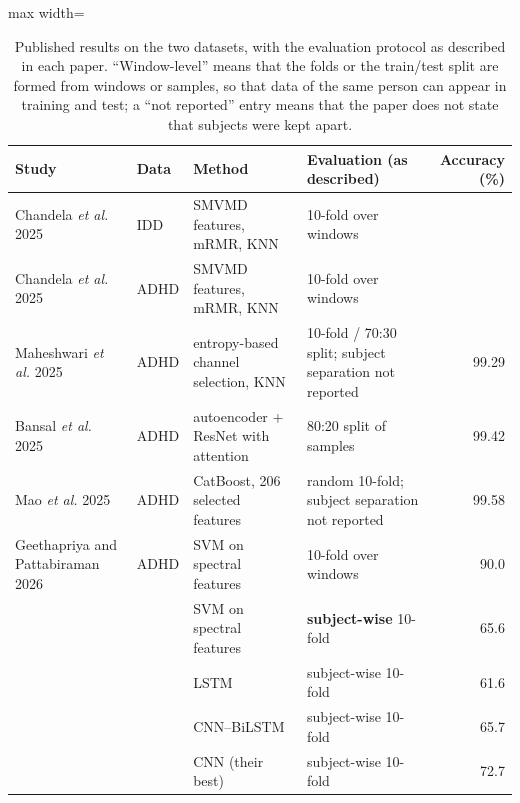 \begin{table}[H]
\caption{Published results on the two datasets, with the evaluation protocol as described in
each paper. ``Window-level'' means that the folds or the train/test split are formed from
windows or samples, so that data of the same person can appear in training and test; a
``not reported'' entry means that the paper does not state that subjects were kept apart.}
\label{tab:lit}\centering\small
\begin{adjustbox}{max width=\textwidth}
\begin{tabular}{p{3.3cm}p{1.2cm}p{4.4cm}p{3.9cm}r}
\hline
Study & Data & Method & Evaluation (as described) & Accuracy (\%) \\
\hline
Chandela \emph{et al.} 2025~\cite{chandela2025} & IDD & SMVMD features, mRMR, KNN & 10-fold over windows & \R{PaperDSoneAcc} \\
Chandela \emph{et al.} 2025~\cite{chandela2025} & ADHD & SMVMD features, mRMR, KNN & 10-fold over windows & \R{PaperDStwoAcc} \\
Maheshwari \emph{et al.} 2025~\cite{maheshwari2025} & ADHD & entropy-based channel selection, KNN & 10-fold / 70:30 split; subject separation not reported & 99.29 \\
Bansal \emph{et al.} 2025~\cite{bansal2025} & ADHD & autoencoder + ResNet with attention & 80:20 split of samples & 99.42 \\
Mao \emph{et al.} 2025~\cite{mao2025} & ADHD & CatBoost, 206 selected features & random 10-fold; subject separation not reported & 99.58 \\
\hline
Geethapriya and Pattabiraman 2026~\cite{geethapriya2026} & ADHD & SVM on spectral features & 10-fold over windows & 90.0 \\
 & & SVM on spectral features & \textbf{subject-wise} 10-fold & 65.6 \\
 & & LSTM & subject-wise 10-fold & 61.6 \\
 & & CNN--BiLSTM & subject-wise 10-fold & 65.7 \\
 & & CNN (their best) & subject-wise 10-fold & 72.7 \\
\hline
\end{tabular}
\end{adjustbox}
\end{table}

